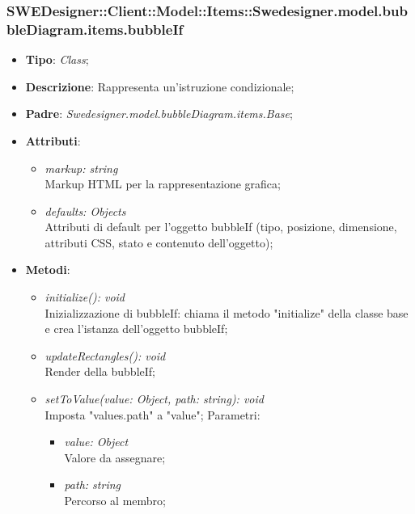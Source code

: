 \documentclass[../DefinizioneDiProdotto.tex]{subfiles}
\begin{document}
			\subsubsection{SWEDesigner::Client::Model::Items::Swedesigner.model.bubbleDiagram.items.bubbleIf}
			\hypertarget{SWEDesigner::Client::Model::Items::Swedesigner.model.bubbleDiagram.items.bubbleIf}{}
			\begin{itemize}
				\item \textbf{Tipo}: \emph{Class};
				\item \textbf{Descrizione}: Rappresenta un'istruzione condizionale;
				\item \textbf{Padre}: \emph{Swedesigner.model.bubbleDiagram.items.Base};
				\item \textbf{Attributi}:
				\begin{itemize}
					\item \emph{markup: string}\\
					Markup HTML per la rappresentazione grafica;
					\item \emph{defaults: Objects}\\
					Attributi di default per l'oggetto bubbleIf (tipo, posizione, dimensione, attributi CSS, stato e contenuto dell'oggetto);
				\end{itemize}
				\item \textbf{Metodi}:
				\begin{itemize}
					\item \emph{initialize(): void}\\
					Inizializzazione di bubbleIf: chiama il metodo "initialize" della classe base e crea l'istanza dell'oggetto bubbleIf;
					\item \emph{updateRectangles(): void}\\
					Render della bubbleIf;
					\item \emph{setToValue(value: Object, path: string): void}\\
					Imposta "values.path" a "value";
					Parametri:
					\begin{itemize}
						\item \emph{value: Object} \\
						Valore da assegnare;
						\item \emph{path: string} \\
						Percorso al membro;
					\end{itemize}
				\end{itemize}
			\end{itemize}
			
\end{document}
